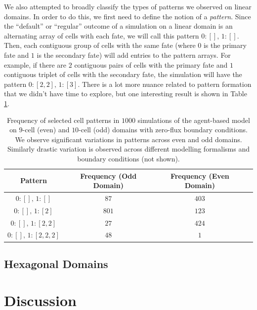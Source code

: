 \documentclass{article}
\begin{document}
\begin{flushleft}

\medskip

We also attempted to broadly classify the types of patterns we observed on linear domains.
In order to do this, we first need to define the notion of a \emph{pattern}.
Since the ``default'' or ``regular'' outcome of a simulation on a linear domain is an alternating array of cells with each fate, we will call this pattern $0: [],\, 1: []$.
Then, each contiguous group of cells with the same fate (where $0$ is the primary fate and $1$ is the secondary fate) will add entries to the pattern arrays.
For example, if there are $2$ contiguous pairs of cells with the primary fate and $1$ contiguous triplet of cells with the secondary fate, the simulation will have the pattern $0: [2, 2], \, 1: [3]$. 
There is a lot more nuance related to pattern formation that we didn't have time to explore, but one interesting result is shown in Table \ref{tb:patterns}.

\begin{table}[!htp]
\centering
\begin{tabular}{|c|c|c|c|} 
 \hline
 Pattern & Frequency (Odd Domain) & Frequency (Even Domain)  \\
 \hline
 $0: [], \, 1: []$ & $87$ & $403$ \\
 $0: [], \, 1: [2]$ & $801$ & $123$ \\
 $0: [], \, 1: [2, 2]$ & $27$ & $424$ \\
 $0: [], \, 1: [2, 2, 2]$ & $48$ & $1$ \\
 \hline
\end{tabular}
\caption{
  Frequency of selected cell patterns in $1000$ simulations of the agent-based model on $9$-cell (even) and $10$-cell (odd) domains with zero-flux boundary conditions. We observe significant variations in patterns across even and odd domains. Similarly drastic variation is observed across different modelling formalisms and boundary conditions (not shown).
}
\label{tb:patterns}
\end{table}

\subsection*{Hexagonal Domains}


\section*{Discussion}


\end{flushleft}
\end{document}
